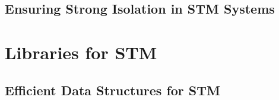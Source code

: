 \documentclass[11pt]{book}
\begin{document}
\chapter{Ensuring Strong Isolation in STM Systems}
\label{chap:SI}
%






\part{Libraries for STM}


\chapter{Efficient Data Structures for STM}
\label{chap:STMlib}


\end{document}
